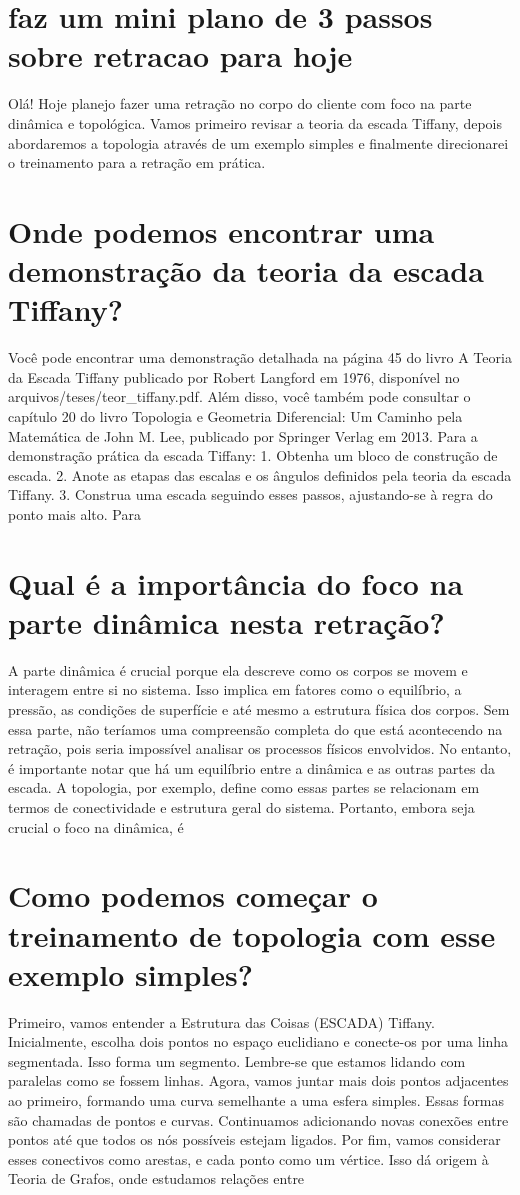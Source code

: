 \documentclass[11pt,a4paper]{article}
\begin{document}
\section{faz um mini plano de 3 passos sobre retracao para hoje}
Olá! Hoje planejo fazer uma retração no corpo do cliente com foco na parte dinâmica e topológica. Vamos primeiro revisar a teoria da escada Tiffany, depois abordaremos a topologia através de um exemplo simples e finalmente direcionarei o treinamento para a retração em prática.

\section{Onde podemos encontrar uma demonstração da teoria da escada Tiffany?}
Você pode encontrar uma demonstração detalhada na página 45 do livro A Teoria da Escada Tiffany publicado por Robert Langford em 1976, disponível no arquivos/teses/teor\_tiffany.pdf. Além disso, você também pode consultar o capítulo 20 do livro Topologia e Geometria Diferencial: Um Caminho pela Matemática de John M. Lee, publicado por Springer Verlag em 2013. Para a demonstração prática da escada Tiffany: 1. Obtenha um bloco de construção de escada. 2. Anote as etapas das escalas e os ângulos definidos pela teoria da escada Tiffany. 3. Construa uma escada seguindo esses passos, ajustando-se à regra do ponto mais alto. Para

\section{Qual é a importância do foco na parte dinâmica nesta retração?}
A parte dinâmica é crucial porque ela descreve como os corpos se movem e interagem entre si no sistema. Isso implica em fatores como o equilíbrio, a pressão, as condições de superfície e até mesmo a estrutura física dos corpos. Sem essa parte, não teríamos uma compreensão completa do que está acontecendo na retração, pois seria impossível analisar os processos físicos envolvidos. No entanto, é importante notar que há um equilíbrio entre a dinâmica e as outras partes da escada. A topologia, por exemplo, define como essas partes se relacionam em termos de conectividade e estrutura geral do sistema. Portanto, embora seja crucial o foco na dinâmica, é

\section{Como podemos começar o treinamento de topologia com esse exemplo simples?}
Primeiro, vamos entender a Estrutura das Coisas (ESCADA) Tiffany. Inicialmente, escolha dois pontos no espaço euclidiano e conecte-os por uma linha segmentada. Isso forma um segmento. Lembre-se que estamos lidando com paralelas como se fossem linhas. Agora, vamos juntar mais dois pontos adjacentes ao primeiro, formando uma curva semelhante a uma esfera simples. Essas formas são chamadas de pontos e curvas. Continuamos adicionando novas conexões entre pontos até que todos os nós possíveis estejam ligados. Por fim, vamos considerar esses conectivos como arestas, e cada ponto como um vértice. Isso dá origem à Teoria de Grafos, onde estudamos relações entre
\end{document}
